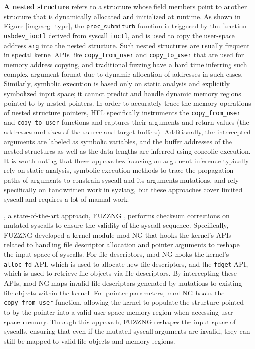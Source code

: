 \textbf{A nested structure} refers to a structure whose field members point to another structure that is dynamically allocated and initialized at runtime. As shown in Figure \ref{img:arg_type}, the \texttt{proc\_submiturb} function is triggered by the function \texttt{usbdev\_ioctl} derived from syscall \texttt{ioctl}, and is used to copy the user-space address \texttt{arg} into the nested structure. Such nested structures are usually frequent in special kernel APIs like \texttt{copy\_from\_user} and \texttt{copy\_to\_user} that are used for memory address copying, and traditional fuzzing have a hard time inferring such complex argument format due to dynamic allocation of addresses in such cases. Similarly, symbolic execution is based only on static analysis and explicitly symbolized input space; it cannot predict and handle dynamic memory regions pointed to by nested pointers. In order to accurately trace the memory operations of nested structure pointers, HFL \cite{kim2020hfl} specifically instruments the \texttt{copy\_from\_user} and \texttt{copy\_to\_user} functions and captures their arguments and return values (\ie the addresses and sizes of the source and target buffers). Additionally, the intercepted arguments are labeled as symbolic variables, and the buffer addresses of the nested structures as well as the data lengths are inferred using concolic execution. It is worth noting that these approaches focusing on argument inference typically rely on static analysis, symbolic execution methods to trace the propagation paths of arguments to constrain syscall and its arguments mutations, and rely specifically on handwritten work in syzlang, but these approaches cover limited syscall and requires a lot of manual work.

, a state-of-the-art approach, FUZZNG \cite{bulekov2023FUZZNG}, performs checksum corrections on mutated syscalls to ensure the validity of the syscall sequence. Specifically, FUZZNG developed a kernel module mod-NG that hooks the kernel's APIs related to handling file descriptor allocation and pointer arguments to reshape the input space of syscalls. For file descriptors, mod-NG hooks the kernel's \texttt{alloc\_fd} API, which is used to allocate new file descriptors, and the \texttt{fdget} API, which is used to retrieve file objects via file descriptors. By intercepting these APIs, mod-NG maps invalid file descriptors generated by mutations to existing file objects within the kernel. For pointer parameters, mod-NG hooks the \texttt{copy\_from\_user} function, allowing the kernel to populate the structure pointed to by the pointer into a valid user-space memory region when accessing user-space memory. Through this approach, FUZZNG reshapes the input space of syscalls, ensuring that even if the mutated syscall arguments are invalid, they can still be mapped to valid file objects and memory regions.


